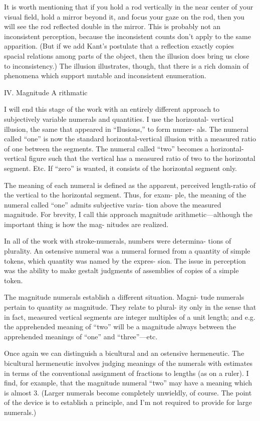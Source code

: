 It is worth mentioning that if you hold a rod vertically in the near 
center of your visual field, hold a mirror beyond it, and focus your gaze 
on the rod, then you will see the rod reflected double in the mirror. This 
is probably not an inconsistent perception, because the inconsistent 
counts don’t apply to the same apparition. (But if we add Kant’s 
postulate that a reflection exactly copies spacial relations among parts 
of the object, then the illusion does bring us close to inconsistency.) The 
illusion illustrates, though, that there is a rich domain of phenomena 
which support mutable and inconsistent enumeration. 


IV. Magnitude A rithmatic 


I will end this stage of the work with an entirely different approach 
to subjectively variable numerals and quantities. I use the horizontal- 
vertical illusion, the same that appeared in “Ilusions,” to form numer- 
als. The numeral called “one” is now the standard horizontal-vertical 
illusion with a measured ratio of one between the segments. The 
numeral called “two” becomes a horizontal-vertical figure such that the 
vertical has a measured ratio of two to the horizontal segment. Etc. If 
“zero” is wanted, it consists of the horizontal segment only. 

The meaning of each numeral is defined as the apparent, perceived 
length-ratio of the vertical to the horizontal segment. Thus, for exam- 
ple, the meaning of the numeral called “one” admits subjective varia- 
tion above the measured magnitude. For brevity, I call this approach 
magnitude arithmetic—although the important thing is how the mag- 
nitudes are realized. 


In all of the work with stroke-numerals, numbers were determina- 
tions of plurality. An ostensive numeral was a numeral formed from a 
quantity of simple tokens, which quantity was named by the expres- 
sion. The issue in perception was the ability to make gestalt judgments 
of assemblies of copies of a simple token. 

The magnitude numerals establish a different situation. Magni- 
tude numerals pertain to quantity as magnitude. They relate to plural- 
ity only in the sense that in fact, measured vertical segments are integer 
multiples of a unit length; and e.g. the apprehended meaning of “two” 
will be a magnitude always between the apprehended meanings of 
“one” and “three”—etc. 

Once again we can distinguish a bicultural and an ostensive 
hermeneutic. The bicultural hermeneutic involves judging meanings of 
the numerals with estimates in terms of the conventional assignment of 
fractions to lengths (as on a ruler). I find, for example, that the 
magnitude numeral “two” may have a meaning which is almost 3. 
(Larger numerals become completely unwieldly, of course. The point of 
the device is to establish a principle, and I’m not required to provide for 
large numerals.) 

